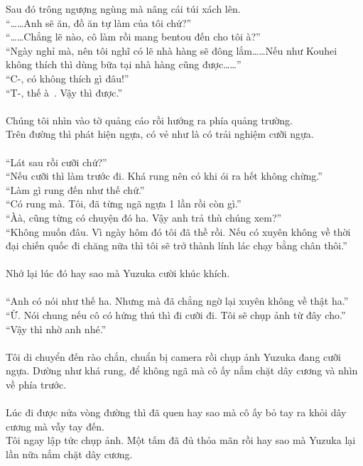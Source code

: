 \documentclass[12pt,a4paper, twosides]{book}
\begin{document}
Sau đó trông ngượng ngùng mà nâng cái túi xách lên.\\
“……Anh sẽ ăn, đồ ăn tự làm của tôi chứ?”\\
“……Chẳng lẽ nào, cô làm rồi mang bentou đến cho tôi à?”\\
“Ngày nghỉ mà, nên tôi nghĩ có lẽ nhà hàng sẽ đông lắm……Nếu như Kouhei không thích thì dùng bữa tại nhà hàng cũng được……”\\
“C-, có không thích gì đâu!”\\
“T-, thế à~. Vậy thì được.”\\
\\
Chúng tôi nhìn vào tờ quảng cáo rồi hướng ra phía quảng trường.\\
Trên đường thì phát hiện ngựa, có vẻ như là có trải nghiệm cưỡi ngựa.\\
\\
“Lát sau rồi cưỡi chứ?”\\
“Nếu cưỡi thì làm trước đi. Khá rung nên có khi ói ra hết không chừng.”\\
“Làm gì rung đến như thế chứ.”\\
“Có rung mà. Tôi, đã từng ngã ngựa 1 lần rồi còn gì.”\\
“Àà, cũng từng có chuyện đó ha. Vậy anh trả thù chúng xem?”\\
“Không muốn đâu. Vì ngày hôm đó tôi đã thề rồi. Nếu có xuyên không về thời đại chiến quốc đi chăng nữa thì tôi sẽ trở thành lính lác chạy bằng chân thôi.”\\
\\
Nhớ lại lúc đó hay sao mà Yuzuka cười khúc khích.\\
\\
“Anh có nói như thế ha. Nhưng mà đã chẳng ngờ lại xuyên không về thật ha.”\\
“Ừ. Nói chung nếu cô có hứng thú thì đi cưỡi đi. Tôi sẽ chụp ảnh từ đây cho.”\\
“Vậy thì nhờ anh nhé.”\\
\\
Tôi di chuyển đến rào chắn, chuẩn bị camera rồi chụp ảnh Yuzuka đang cưỡi ngựa. Dường như khá rung, để không ngã mà cô ấy nắm chặt dây cương và nhìn về phía trước.\\
\\
Lúc đi được nửa vòng đường thì đã quen hay sao mà cô ấy bỏ tay ra khỏi dây cương mà vẫy tay đến.\\
Tôi ngay lập tức chụp ảnh. Một tấm đã đủ thỏa mãn rồi hay sao mà Yuzuka lại lần nữa nắm chặt dây cương.\\
\\
\end{document}
